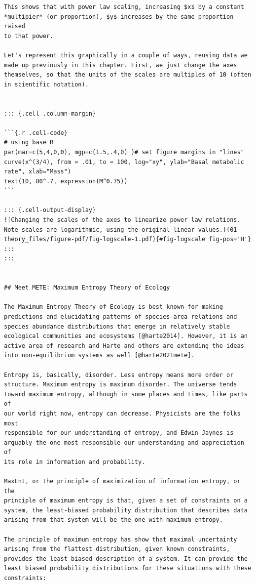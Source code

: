 \documentclass[
  10pt,
  letterpaper,
  nols]{tufte-book}
\begin{document}
\begin{verbatim}
This shows that with power law scaling, increasing $x$ by a constant
*multipier* (or proportion), $y$ increases by the same proportion raised
to that power.

Let's represent this graphically in a couple of ways, reusing data we
made up previously in this chapter. First, we just change the axes
themselves, so that the units of the scales are multiples of 10 (often
in scientific notation).


::: {.cell .column-margin}

```{.r .cell-code}
# using base R
par(mar=c(5,4,0,0), mgp=c(1.5,.4,0) )# set figure margins in "lines"
curve(x^(3/4), from = .01, to = 100, log="xy", ylab="Basal metabolic rate", xlab="Mass")
text(10, 80^.7, expression(M^0.75))
```

::: {.cell-output-display}
![Changing the scales of the axes to linearize power law relations. Note scales are logarithmic, using the original linear values.](01-theory_files/figure-pdf/fig-logscale-1.pdf){#fig-logscale fig-pos='H'}
:::
:::


## Meet METE: Maximum Entropy Theory of Ecology

The Maximum Entropy Theory of Ecology is best known for making
predictions and elucidating patterns of species-area relations and
species abundance distributions that emerge in relatively stable
ecological communities and ecosystems [@harte2014]. However, it is an
active area of research and Harte and others are extending the ideas
into non-equilibrium systems as well [@harte2021mete].

Entropy is, basically, disorder. Less entropy means more order or
structure. Maximum entropy is maximum disorder. The universe tends
toward maximum entropy, although in some places and times, like parts of
our world right now, entropy can decrease. Physicists are the folks most
responsible for our understanding of entropy, and Edwin Jaynes is
arguably the one most responsible our understanding and appreciation of
its role in information and probability.

MaxEnt, or the principle of maximization of information entropy, or the
principle of maximum entropy is that, given a set of constraints on a
system, the least-biased probability distribution that describes data
arising from that system will be the one with maximum entropy.

The principle of maximum entropy has show that maximal uncertainty
arising from the flattest distribution, given known constraints,
provides the least biased description of a system. It can provide the
least biased probability distributions for these situations with these
constraints:


\end{verbatim}
\end{document}
